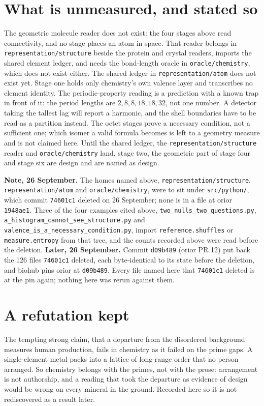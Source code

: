 \section*{What is unmeasured, and stated so}

The geometric molecule reader does not exist: the four stages above read connectivity, and no stage
places an atom in space. That reader belongs in \texttt{representation/structure} beside the protein
and crystal readers, imports the shared element ledger, and needs the bond-length oracle in
\texttt{oracle/chemistry}, which does not exist either. The shared ledger in
\texttt{representation/atom} does not exist yet. Stage one holds only chemistry's own valence layer
and transcribes no element identity. The periodic-property reading is a prediction with a known trap
in front of it: the period lengths are \(2, 8, 8, 18, 18, 32\), not one number. A detector taking the
tallest lag will report a harmonic, and the shell boundaries have to be read as a partition instead.
The octet stages prove a necessary condition, not a sufficient one; which isomer a valid formula
becomes is left to a geometry measure and is not claimed here. Until the shared ledger, the
\texttt{representation/structure} reader and \texttt{oracle/chemistry} land, stage two, the geometric
part of stage four and stage six are design and are named as design.

\textbf{Note, 26 September.} The homes named above, \texttt{representation/structure},
\texttt{representation/atom} and \texttt{oracle/chemistry}, were to sit under
\texttt{src/python/}, which commit \texttt{74601c1} deleted on 26 September; none is in a file
at orior \texttt{1948ae1}. Three of the four examples cited above,
\texttt{two\_nulls\_two\_questions.py}, \texttt{a\_histogram\_cannot\_see\_structure.py} and
\texttt{valence\_is\_a\_necessary\_condition.py}, import \texttt{reference.shuffles} or
\texttt{measure.entropy} from that tree, and the counts recorded above were read before the deletion.
\textbf{Later, 26 September.} Commit \texttt{d09b489} (orior PR 12) put back the 126 files
\texttt{74601c1} deleted, each byte-identical to its state before the deletion, and biohub pins
orior at \texttt{d09b489}. Every file named here that \texttt{74601c1} deleted is at the pin
again; nothing here was rerun against them.

\section*{A refutation kept}

The tempting strong claim, that a departure from the disordered background measures human production,
fails in chemistry as it failed on the prime gaps. A single-element metal packs into a lattice of
long-range order that no person arranged. So chemistry belongs with the primes, not with the prose:
arrangement is not authorship, and a reading that took the departure as evidence of design would be
wrong on every mineral in the ground. Recorded here so it is not rediscovered as a result later.
